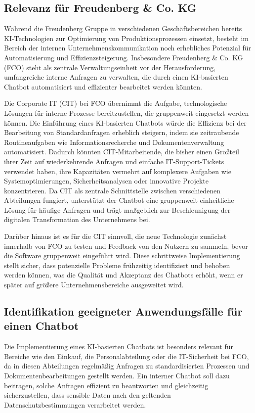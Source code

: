 \subsection{Relevanz für Freudenberg \& Co. KG}

Während die Freudenberg Gruppe in verschiedenen Geschäftsbereichen bereits \ac{KI}-Technologien zur Optimierung von Produktionsprozessen einsetzt, 
besteht im Bereich der internen Unternehmenskommunikation noch erhebliches Potenzial für Automatisierung und Effizienzsteigerung. 
Insbesondere Freudenberg \& Co. KG (\ac{FCO}) steht als zentrale Verwaltungseinheit vor der Herausforderung, umfangreiche interne Anfragen zu verwalten, 
die durch einen \ac{KI}-basierten Chatbot automatisiert und effizienter bearbeitet werden könnten.

Die Corporate IT (\ac{CIT}) bei \ac{FCO} übernimmt die Aufgabe, technologische Lösungen für interne Prozesse bereitzustellen, die gruppenweit eingesetzt werden können. 
Die Einführung eines \ac{KI}-basierten Chatbots würde die Effizienz bei der Bearbeitung von Standardanfragen erheblich steigern, 
indem sie zeitraubende Routineaufgaben wie Informationsrecherche und Dokumentenverwaltung automatisiert. 
Dadurch könnten \ac{CIT}-Mitarbeitende, die bisher einen Großteil ihrer Zeit auf wiederkehrende Anfragen und einfache IT-Support-Tickets verwendet haben, 
ihre Kapazitäten vermehrt auf komplexere Aufgaben wie Systemoptimierungen, Sicherheitsanalysen oder innovative Projekte konzentrieren. 
Da \ac{CIT} als zentrale Schnittstelle zwischen verschiedenen Abteilungen fungiert, 
unterstützt der Chatbot eine gruppenweit einheitliche Lösung für häufige Anfragen und trägt maßgeblich zur Beschleunigung der digitalen Transformation des Unternehmens bei.

Darüber hinaus ist es für die \ac{CIT} sinnvoll, die neue Technologie zunächst innerhalb von \ac{FCO} zu testen und Feedback von den Nutzern zu sammeln, bevor die Software gruppenweit eingeführt wird. 
Diese schrittweise Implementierung stellt sicher, dass potenzielle Probleme frühzeitig identifiziert und behoben werden können, was die Qualität und Akzeptanz des Chatbots erhöht, 
wenn er später auf größere Unternehmensbereiche ausgeweitet wird.

\subsection{Identifikation geeigneter Anwendungsfälle für einen Chatbot}

Die Implementierung eines \ac{KI}-basierten Chatbots ist besonders relevant für Bereiche wie den Einkauf, die Personalabteilung oder die IT-Sicherheit bei \ac{FCO}, 
da in diesen Abteilungen regelmäßig Anfragen zu standardisierten Prozessen und Dokumentenbearbeitungen gestellt werden. 
Ein interner Chatbot soll dazu beitragen, solche Anfragen effizient zu beantworten und gleichzeitig sicherzustellen, dass sensible Daten nach den geltenden Datenschutzbestimmungen verarbeitet werden.

